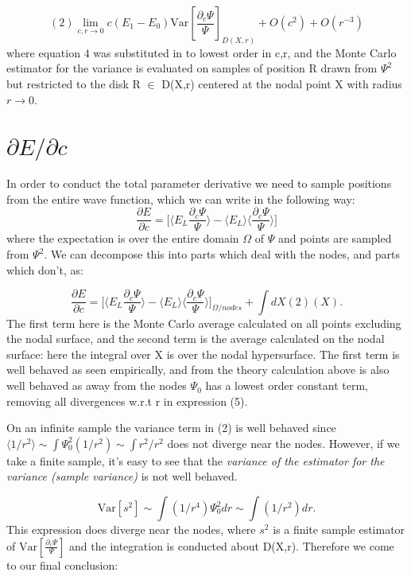 \documentclass{article}
\begin{document}
\begin{equation}
\boxed{(2) \lim_{c,r \rightarrow 0} c(E_1-E_0) \text{Var}[\frac{\partial_c \Psi}{\Psi}]_{D(X,r)}+ O(c^2) + O(r^{-3})}
\end{equation}
where equation 4 was substituted in to lowest order in c,r, and the Monte Carlo estimator for the variance is evaluated on samples of position R drawn from $\Psi^2$ but restricted to the disk R $\in$ D(X,r) centered at the nodal point X with radius $r \rightarrow 0$.

\section{$\partial E/\partial c$}
In order to conduct the total parameter derivative we need to sample positions from the entire wave function, which we can write in the following way:
$$\frac{\partial E}{\partial c} = \Bigg[\langle E_L \frac{\partial_c\Psi}{\Psi}\rangle - \langle E_L \rangle \langle\frac{\partial_c\Psi}{\Psi}\rangle \Bigg]$$
where the expectation is over the entire domain $\Omega$ of $\Psi$ and points are sampled from $\Psi^2$. We can decompose this into parts which deal with the nodes, and parts which don't, as:

\begin{equation}
\boxed{\frac{\partial E}{\partial c} = \Bigg[\langle E_L \frac{\partial_c\Psi}{\Psi}\rangle - \langle E_L \rangle \langle\frac{\partial_c\Psi}{\Psi}\rangle \Bigg]_{\Omega/nodes}
+ \int dX (2)(X).}
\end{equation}
The first term here is the Monte Carlo average calculated on all points excluding the nodal surface, and the second term is the average calculated on the nodal surface: here the integral over X is over the nodal hypersurface. The first term is well behaved as seen empirically, and from the theory calculation above is also well behaved as away from the nodes $\Psi_0$ has a lowest order constant term, removing all divergences w.r.t r in expression (5).

On an infinite sample the variance term in (2) is well behaved since $\langle 1/r^2 \rangle \sim \int \Psi_0^2 (1/r^2) \sim \int r^2/r^2 $ does not diverge near the nodes. However, if we take a finite sample, it's easy to see that the \textit{variance of the estimator for the variance (sample variance)} is not well behaved.

$$\text{Var}[s^2] \sim \int (1/r^4) \Psi_0^2 dr \sim \int (1/r^2)dr. $$
This expression does diverge near the nodes, where $s^2$ is a finite sample estimator of $\text{Var}[\frac{\partial_c \Psi}{\Psi}]$ and the integration is conducted about D(X,r). Therefore we come to our final conclusion:
\end{document}
